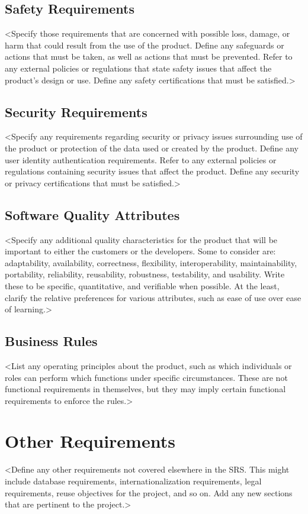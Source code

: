 \documentclass{article}
\begin{document}
\subsection{Safety Requirements}
<Specify those requirements that are concerned with possible loss, damage, or harm that could result from the use of the product. Define any safeguards or actions that must be taken, as well as actions that must be prevented. Refer to any external policies or regulations that state safety issues that affect the product’s design or use. Define any safety certifications that must be satisfied.>
\subsection{Security Requirements}
<Specify any requirements regarding security or privacy issues surrounding use of the product or protection of the data used or created by the product. Define any user identity authentication requirements. Refer to any external policies or regulations containing security issues that affect the product. Define any security or privacy certifications that must be satisfied.>
\subsection{Software Quality Attributes}
<Specify any additional quality characteristics for the product that will be important to either the customers or the developers. Some to consider are: adaptability, availability, correctness, flexibility, interoperability, maintainability, portability, reliability, reusability, robustness, testability, and usability. Write these to be specific, quantitative, and verifiable when possible. At the least, clarify the relative preferences for various attributes, such as ease of use over ease of learning.>
\subsection{Business Rules}
<List any operating principles about the product, such as which individuals or roles can perform which functions under specific circumstances. These are not functional requirements in themselves, but they may imply certain functional requirements to enforce the rules.>


\section{Other Requirements}
<Define any other requirements not covered elsewhere in the SRS. This might include database requirements, internationalization requirements, legal requirements, reuse objectives for the project, and so on. Add any new sections that are pertinent to the project.>
\end{document}
